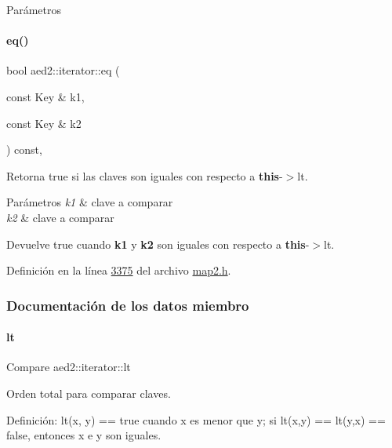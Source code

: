 \begin{DoxyParams}{\-Parámetros}
\begin{DoxyCompactItemize}
\paragraph{\texorpdfstring{eq()}{eq()}}
{\footnotesize\ttfamily bool aed2\+::iterator\+::eq (\begin{DoxyParamCaption}\item[{const Key \&}]{k1,  }\item[{const Key \&}]{k2 }\end{DoxyParamCaption}) const\hspace{0.3cm}{\ttfamily [inline]}, {\ttfamily [private]}}



Retorna true si las claves son iguales con respecto a {\bfseries this}-\/$>$lt. 


\begin{DoxyParams}{Parámetros}
{\em k1} & clave a comparar \\
\hline
{\em k2} & clave a comparar \\
\hline
\end{DoxyParams}
\begin{DoxyReturn}{Devuelve}
true cuando {\bfseries k1} y {\bfseries k2} son iguales con respecto a {\bfseries this}-\/$>$lt. 
\end{DoxyReturn}


Definición en la línea \hyperlink{map2_8h_source_l03375}{3375} del archivo \hyperlink{map2_8h_source}{map2.\+h}.



\subsubsection{Documentación de los datos miembro}
\mbox{\label{classaed2_1_1iterator_a3f219bfe5e047bbec03e3339770ae414_a3f219bfe5e047bbec03e3339770ae414}} 
\paragraph{\texorpdfstring{lt}{lt}}
{\footnotesize\ttfamily Compare aed2\+::iterator\+::lt\hspace{0.3cm}{\ttfamily [private]}}



Orden total para comparar claves. 

Definición\+: lt(x, y) == true cuando x es menor que y; si lt(x,y) == lt(y,x) == false, entonces x e y son iguales. 


\end{DoxyCompactItemize}
\end{DoxyParams}
